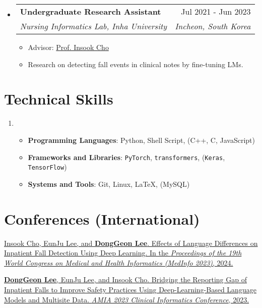 \documentclass[letterpaper,11pt]{article}
\makeatletter
\newcommand{\resumeSubheading}[4]{
  \vspace{-1pt}\item
    \begin{tabular*}{0.97\textwidth}{l@{\extracolsep{\fill}}r}
      #1 & #2 \\
      \textit{\small#3} & \textit{\small #4} \\
    \end{tabular*}\vspace{-5pt}
}
\makeatother
\begin{document}
\begin{itemize}[leftmargin=*,label=]
        \resumeSubheading
        {\textbf{Undergraduate Research Assistant}}{Jul 2021 - Jun 2023}
            {Nursing Informatics Lab, Inha University}{Incheon, South Korea}
            \begin{itemize}[label=\bullet]
                \item{Advisor: \href{http://bit.ly/412nYOw}{Prof. Insook Cho}}
                \item{Research on detecting fall events in clinical notes by fine-tuning LMs.}
            \end{itemize}
            
            
    \end{itemize}

    \section{Technical Skills}
    \begin{enumerate}[noitemsep, leftmargin=*,label=]
        \item{
            \begin{itemize}[label=\bullet]
                \item{\textbf{Programming Languages}: Python, Shell Script, (C++, C, JavaScript)}
                \item{\textbf{Frameworks and Libraries}: \texttt{PyTorch}, \texttt{transformers}, (\texttt{Keras}, \texttt{TensorFlow})}
                \item{\textbf{Systems and Tools}: Git, Linux, \LaTeX, (MySQL)}
            \end{itemize}
        }
    \end{enumerate}

    \section{Conferences (International)}
    \begin{enumerate}[noitemsep, leftmargin=*,label={[\arabic*]}]
        \item \href{https://pubmed.ncbi.nlm.nih.gov/38426881/}{Insook Cho, EunJu Lee, and \textbf{DongGeon Lee}. Effects of Language Differences on Inpatient Fall Detection Using Deep Learning. In the \textit{Proceedings of the 19th World Congress on Medical and Health Informatics (MedInfo 2023)}, 2024.}
        
        \item \href{https://bit.ly/cic23s47}{\textbf{DongGeon Lee}, EunJu Lee, and Insook Cho. Bridging the Reporting Gap of Inpatient Falls to Improve Safety Practices Using Deep-Learning-Based Language Models and Multisite Data. \textit{AMIA 2023 Clinical Informatics Conference}, 2023.}
    \end{enumerate}
        
\end{document}
